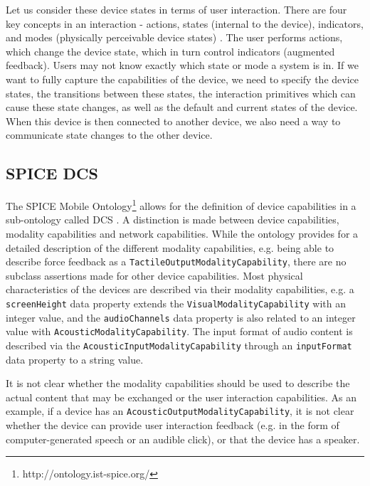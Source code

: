 Let us consider these device states in terms of user interaction. There are four key concepts in an interaction - actions, states (internal to the device), indicators, and modes (physically perceivable device states) \cite{Thimbleby2007}. The user performs actions, which change the device state, which in turn control indicators (augmented feedback). Users may not know exactly which state or mode a system is in. If we want to fully capture the capabilities of the device, we need to specify the device states, the transitions between these states, the interaction primitives which can cause these state changes, as well as the default and current states of the device. When this device is then connected to another device, we also need a way to communicate state changes to the other device.




\subsection{SPICE DCS}

The SPICE Mobile Ontology\footnote{http://ontology.ist-spice.org/} allows for the definition of device capabilities in a sub-ontology called \ac{DCS} \cite{Villalonga2009}. A distinction is made between device capabilities, modality capabilities and network capabilities. While the ontology provides for a detailed description of the different modality capabilities, e.g. being able to describe force feedback as a \texttt{TactileOutputModalityCapability}, there are no subclass assertions made for other device capabilities. Most physical characteristics of the devices are described via their modality capabilities, e.g. a \texttt{screenHeight} data property extends the \texttt{VisualModalityCapability} with an integer value, and the \texttt{audioChannels} data property is also related to an integer value with \texttt{Acoustic\-Modality\-Capability}. The input format of audio content is described via the \texttt{AcousticInputModalityCapability} through an \texttt{inputFormat} data property to a string value.

It is not clear whether the modality capabilities should be used to describe the actual content that may be exchanged or the user interaction capabilities. As an example, if a device has an \texttt{Acoustic\-Output\-Modality\-Capability}, it is not clear whether the device can provide user interaction feedback (e.g. in the form of computer-generated speech or an audible click), or that the device has a speaker.




